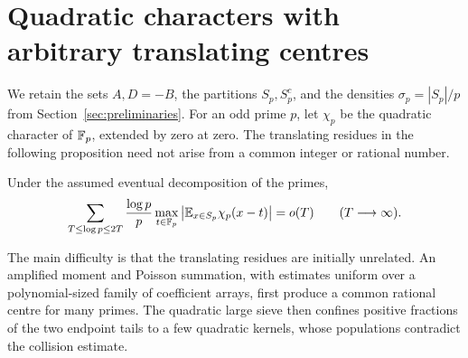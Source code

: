 \section{Quadratic characters with arbitrary translating centres}
\label{sec:quadratic}

We retain the sets $A,D=-B$, the partitions $S_p,S_p^c$, and the
densities $\sigma_p=|S_p|/p$ from Section~\ref{sec:preliminaries}.
For an odd prime $p$, let $\chi_p$ be the quadratic character of
$\mathbb F_p$, extended by zero at zero.  The translating residues in the
following proposition need not arise from a common integer or rational
number.

\begin{proposition}\label{prop:quadratic}
Under the assumed eventual decomposition of the primes,
\begin{equation}\label{eq:src3}
 \sum_{T\leq \log p\leq 2T}\frac{\log p}{p}
 \max_{t\in\mathbb F_p}
 \left|\mathbb E_{x\in S_p}\chi_p(x-t)\right|=o(T)
 \qquad (T\longrightarrow\infty).
\end{equation}
\end{proposition}

The main difficulty is that the translating residues are initially
unrelated.  An amplified moment and Poisson summation, with estimates
uniform over a polynomial-sized family of coefficient arrays, first
produce a common rational centre for many primes.  The quadratic large
sieve then confines positive fractions of the two endpoint tails to a
few quadratic kernels, whose populations contradict the collision estimate.


